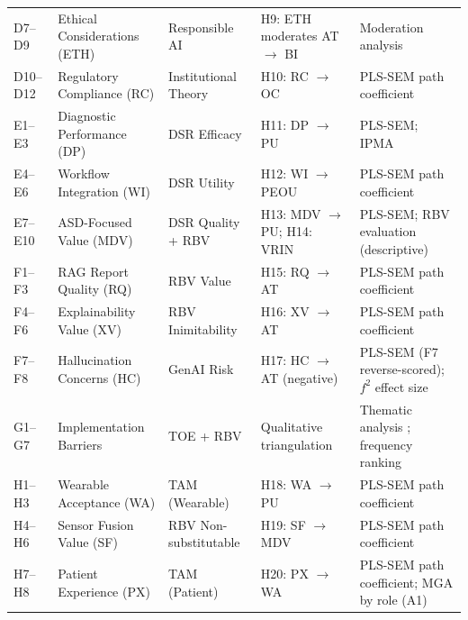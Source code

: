 {\begin{xltabular}{\textwidth}{@{} p{1.0cm} L L L L @{}}
\addlinespace
D7--D9 & Ethical Considerations (ETH) & Responsible AI & H9: ETH moderates AT $\rightarrow$ BI & Moderation analysis \\
\addlinespace
D10--D12 & Regulatory Compliance (RC) & Institutional Theory & H10: RC $\rightarrow$ OC & PLS-SEM path coefficient \\
\addlinespace
E1--E3 & Diagnostic Performance (DP) & DSR Efficacy & H11: DP $\rightarrow$ PU & PLS-SEM; IPMA \\
\addlinespace
E4--E6 & Workflow Integration (WI) & DSR Utility & H12: WI $\rightarrow$ PEOU & PLS-SEM path coefficient \\
\addlinespace
E7--E10 & ASD-Focused Value (MDV) & DSR Quality + RBV & H13: MDV $\rightarrow$ PU; H14: VRIN & PLS-SEM; RBV evaluation (descriptive) \\
\addlinespace
F1--F3 & RAG Report Quality (RQ) & RBV Value & H15: RQ $\rightarrow$ AT & PLS-SEM path coefficient \\
\addlinespace
F4--F6 & Explainability Value (XV) & RBV Inimitability & H16: XV $\rightarrow$ AT & PLS-SEM path coefficient \\
\addlinespace
F7--F8 & Hallucination Concerns (HC) & GenAI Risk & H17: HC $\rightarrow$ AT (negative) & PLS-SEM (F7 reverse-scored); $f^2$ effect size \\
\addlinespace
G1--G7 & Implementation Barriers & TOE + RBV & Qualitative triangulation & Thematic analysis \cite{braun2006thematic}; frequency ranking \\
\addlinespace
H1--H3 & Wearable Acceptance (WA) & TAM (Wearable) & H18: WA $\rightarrow$ PU & PLS-SEM path coefficient \\
\addlinespace
H4--H6 & Sensor Fusion Value (SF) & RBV Non-substitutable & H19: SF $\rightarrow$ MDV & PLS-SEM path coefficient \\
\addlinespace
H7--H8 & Patient Experience (PX) & TAM (Patient) & H20: PX $\rightarrow$ WA & PLS-SEM path coefficient; MGA by role (A1) \\
\end{xltabular}}

